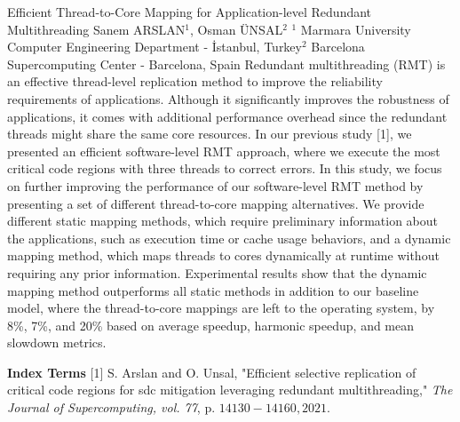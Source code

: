 
    \begin{abstract_online}{Efficient Thread-to-Core Mapping for Application-level Redundant Multithreading}{%
        Sanem ARSLAN$^{1}$, Osman ÜNSAL$^{2}$}{%
        }{%
        $^1$ Marmara University Computer Engineering Department - İstanbul, Turkey\newline{}$^2$ Barcelona Supercomputing Center - Barcelona, Spain}
    Redundant multithreading (RMT) is an effective thread-level replication method to improve the reliability requirements of applications. Although it significantly improves the robustness of applications, it comes with additional performance overhead since the redundant threads might share the same core resources. In our previous study [1], we presented an efficient software-level RMT approach, where we execute the most critical code regions with three threads to correct errors. In this study, we focus on further improving the performance of our software-level RMT method by presenting a set of different thread-to-core mapping alternatives. We provide different static mapping methods, which require preliminary information about the applications, such as execution time or cache usage behaviors, and a dynamic mapping method, which maps threads to cores dynamically at runtime without requiring any prior information. Experimental results show that the dynamic mapping method outperforms all static methods in addition to our baseline model, where the thread-to-core mappings are left to the operating system, by 8\%, 7\%, and 20\% based on average speedup, harmonic speedup, and mean slowdown metrics. 
    
            \textbf{Index Terms} \newline{}[1] S. Arslan and O. Unsal, "Efficient selective replication of critical code regions for sdc mitigation leveraging redundant multithreading," \textit{The Journal of Supercomputing, vol. 77}, p. $14130-14160,2021$.
    \end{abstract_online}
    